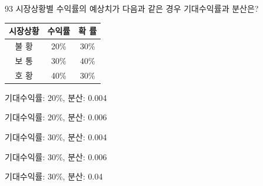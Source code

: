 \begin{question}{93}
시장상황별 수익률의 예상치가 다음과 같은 경우 기대수익률과 분산은?
\begin{center}
\begin{tabular}{|c|c|c|}\hline
시장상황 & 수익률 & 확 률 \\ \hline
불 황 & 20\% & 30\% \\ \hline
보 통 & 30\% & 40\% \\ \hline
호 황 & 40\% & 30\% \\ \hline
\end{tabular}
\end{center}
\begin{choices}
  \item 기대수익률: 20\%, 분산: 0.004
  \item 기대수익률: 20\%, 분산: 0.006
  \item 기대수익률: 30\%, 분산: 0.004
  \item 기대수익률: 30\%, 분산: 0.006
  \item 기대수익률: 30\%, 분산: 0.04
\end{choices}
\end{question}
